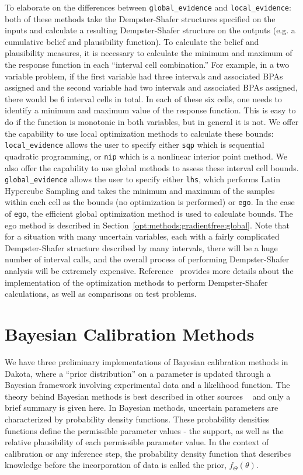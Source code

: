 To elaborate on the differences between \texttt{global\_evidence} and
\texttt{local\_evidence}: both of these methods take the
Dempster-Shafer structures specified on the inputs and calculate a
resulting Dempster-Shafer structure on the outputs (e.g. a cumulative
belief and plausibility function).  To calculate the belief and
plausibility measures, it is necessary to calculate the minimum and
maximum of the response function in each ``interval cell
combination.''  For example, in a two variable problem, if the first
variable had three intervals and associated BPAs assigned and the
second variable had two intervals and associated BPAs assigned, there
would be 6 interval cells in total.  In each of these six cells, one
needs to identify a minimum and maximum value of the response
function. This is easy to do if the function is monotonic in both
variables, but in general it is not. We offer the capability to use
local optimization methods to calculate these bounds:
\texttt{local\_evidence} allows the user to specify either
\texttt{sqp} which is sequential quadratic programming, or
\texttt{nip} which is a nonlinear interior point method. We also offer
the capability to use global methods to assess these interval cell
bounds. \texttt{global\_evidence} allows the user to specify either
\texttt{lhs}, which performs Latin Hypercube Sampling and takes the
minimum and maximum of the samples within each cell as the bounds (no
optimization is performed) or \texttt{ego}. In the case of
\texttt{ego}, the efficient global optimization method is used to
calculate bounds. The ego method is described in
Section~\ref{opt:methods:gradientfree:global}.  Note that for a
situation with many uncertain variables, each with a fairly
complicated Dempster-Shafer structure described by many intervals,
there will be a huge number of interval calls, and the overall process
of performing Dempster-Shafer analysis will be extremely expensive.
Reference~\cite{Tang10b} provides more details about the
implementation of the optimization methods to perform Dempster-Shafer
calculations, as well as comparisons on test problems.

\section{Bayesian Calibration Methods}\label{uq:bayesian}

We have three preliminary implementations of Bayesian calibration methods 
in Dakota, where a ``prior distribution'' on a parameter is 
updated through a Bayesian framework involving experimental data and 
a likelihood function. 
The theory behind Bayesian methods is best described in other sources 
~\cite{Kenn01} and only a brief summary is given here. 
In Bayesian methods, uncertain parameters are characterized by probability 
density functions. These probability densities functions define the 
permissible parameter values - the support, as well as the relative
 plausibility of each permissible parameter value. In the context of 
calibration or any inference step, the probability density function 
that describes knowledge before the incorporation of data is called 
the prior, $f_\Theta\left( \theta  \right)$.
 
